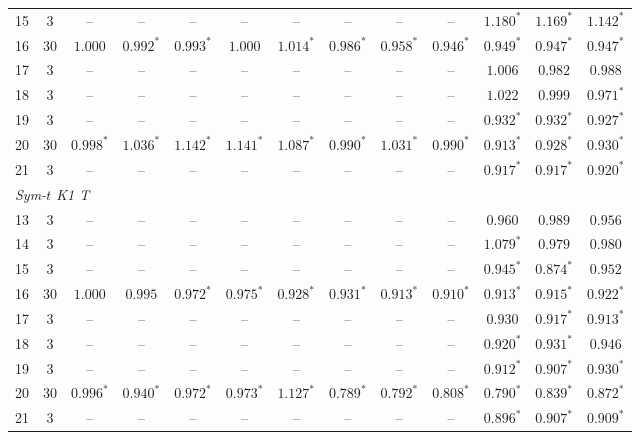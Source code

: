 \begin{table}[p]
\begin{tabular}{ccccccccccccc}
15 & 3 & -- & -- & -- & -- & -- & -- & -- & -- & $1.180^{*}$ & $1.169^{*}$ & $1.142^{*}$ \\
16 & 30 & $1.000$ & $0.992^{*}$ & $0.993^{*}$ & $1.000$ & $1.014^{*}$ & $0.986^{*}$ & $0.958^{*}$ & $0.946^{*}$ & $0.949^{*}$ & $0.947^{*}$ & $0.947^{*}$ \\
17 & 3 & -- & -- & -- & -- & -- & -- & -- & -- & $1.006$ & $0.982$ & $0.988$ \\
18 & 3 & -- & -- & -- & -- & -- & -- & -- & -- & $1.022$ & $0.999$ & $0.971^{*}$ \\
19 & 3 & -- & -- & -- & -- & -- & -- & -- & -- & $0.932^{*}$ & $0.932^{*}$ & $0.927^{*}$ \\
20 & 30 & $0.998^{*}$ & $1.036^{*}$ & $1.142^{*}$ & $1.141^{*}$ & $1.087^{*}$ & $0.990^{*}$ & $1.031^{*}$ & $0.990^{*}$ & $0.913^{*}$ & $0.928^{*}$ & $0.930^{*}$ \\
21 & 3 & -- & -- & -- & -- & -- & -- & -- & -- & $0.917^{*}$ & $0.917^{*}$ & $0.920^{*}$ \\
\midrule
\multicolumn{13}{l}{\emph{Sym-$t$ K1 T}} \\[1pt]
13 & 3 & -- & -- & -- & -- & -- & -- & -- & -- & $0.960$ & $0.989$ & $0.956$ \\
14 & 3 & -- & -- & -- & -- & -- & -- & -- & -- & $1.079^{*}$ & $0.979$ & $0.980$ \\
15 & 3 & -- & -- & -- & -- & -- & -- & -- & -- & $0.945^{*}$ & $0.874^{*}$ & $0.952$ \\
16 & 30 & $1.000$ & $0.995$ & $0.972^{*}$ & $0.975^{*}$ & $0.928^{*}$ & $0.931^{*}$ & $0.913^{*}$ & $0.910^{*}$ & $0.913^{*}$ & $0.915^{*}$ & $0.922^{*}$ \\
17 & 3 & -- & -- & -- & -- & -- & -- & -- & -- & $0.930$ & $0.917^{*}$ & $0.913^{*}$ \\
18 & 3 & -- & -- & -- & -- & -- & -- & -- & -- & $0.920^{*}$ & $0.931^{*}$ & $0.946$ \\
19 & 3 & -- & -- & -- & -- & -- & -- & -- & -- & $0.912^{*}$ & $0.907^{*}$ & $0.930^{*}$ \\
20 & 30 & $0.996^{*}$ & $0.940^{*}$ & $0.972^{*}$ & $0.973^{*}$ & $1.127^{*}$ & $0.789^{*}$ & $0.792^{*}$ & $0.808^{*}$ & $0.790^{*}$ & $0.839^{*}$ & $0.872^{*}$ \\
21 & 3 & -- & -- & -- & -- & -- & -- & -- & -- & $0.896^{*}$ & $0.907^{*}$ & $0.909^{*}$ \\
\bottomrule
\end{tabular}
\end{table}
